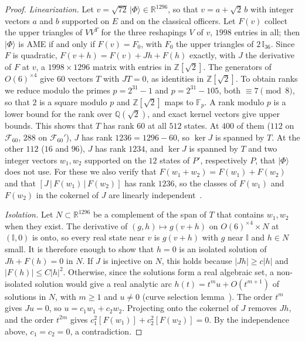 \documentclass[aps,pra,reprint,superscriptaddress,amsmath,amssymb,longbibliography]{revtex4-2}
\newcommand{\ket}[1]{\lvert #1\rangle}
\theoremstyle{plain}
\begin{document}
\begin{proof}
\emph{Linearization.}  Let $v=\sqrt{72}\,\ket\Phi\in\mathbb R^{1296}$, so that $v=a+\sqrt2\,b$ with integer vectors $a$
and $b$ supported on $E$ and on the classical officers.  Let $F(v)$ collect the upper triangles of $V V^T$ for the three
reshapings $V$ of $v$, $1998$ entries in all; then $\ket\Phi$ is AME if and only if $F(v)=F_0$, with $F_0$ the upper
triangles of $2\,\mathbb I_{36}$.  Since $F$ is quadratic, $F(v+h)=F(v)+Jh+F(h)$ exactly, with $J$ the derivative of
$F$ at $v$, a $1998\times1296$ matrix with entries in $\mathbb Z[\sqrt2]$.  The generators of $O(6)^{\times4}$ give $60$
vectors $T$ with $JT=0$, as identities in $\mathbb Z[\sqrt2]$.  To obtain ranks we reduce modulo the primes
$p=2^{31}-1$ and $p=2^{31}-105$, both $\equiv7\pmod 8$, so that $2$ is a square modulo $p$ and $\mathbb Z[\sqrt2]$ maps
to $\mathbb F_p$.  A rank modulo $p$ is a lower bound for the rank over $\mathbb Q(\sqrt2)$, and exact kernel vectors give
upper bounds.  This shows that $T$ has rank $60$ at all $512$ states.  At $400$ of them ($112$ on $\mathcal F_{60}$, $288$
on $\mathcal F_{60}'$), $J$ has rank $1236=1296-60$, so $\ker J$ is spanned by $T$.  At the other $112$ ($16$ and $96$),
$J$ has rank $1234$, and $\ker J$ is spanned by $T$ and two integer vectors $w_1,w_2$ supported on the $12$ states of
$P'$, respectively $P$, that $\ket\Phi$ does not use.  For these we also verify that $F(w_1+w_2)=F(w_1)+F(w_2)$ and that
$[J\,|\,F(w_1)\,|\,F(w_2)]$ has rank $1236$, so the classes of $F(w_1)$ and $F(w_2)$ in the cokernel of $J$ are
linearly independent~\cite{repo}.

\emph{Isolation.}  Let $N\subset\mathbb R^{1296}$ be a complement of the span of $T$ that contains $w_1,w_2$ when they
exist.  The derivative of $(g,h)\mapsto g(v+h)$ on $O(6)^{\times4}\times N$ at $(\mathbb I,0)$ is onto, so every real
state near $v$ is $g(v+h)$ with $g$ near $\mathbb I$ and $h\in N$ small.  It is therefore enough to show that $h=0$ is
an isolated solution of $Jh+F(h)=0$ in $N$.  If $J$ is injective on $N$, this holds because $|Jh|\ge c|h|$ and
$|F(h)|\le C|h|^2$.  Otherwise, since the solutions form a real algebraic set, a non-isolated solution would give a real
analytic arc $h(t)=t^mu+O(t^{m+1})$ of solutions in $N$, with $m\ge1$ and $u\ne0$ (curve selection lemma~\cite{Milnor1968}).  The order $t^m$
gives $Ju=0$, so $u=c_1w_1+c_2w_2$.  Projecting onto the cokernel of $J$ removes $Jh$, and the order $t^{2m}$ gives
$c_1^2[F(w_1)]+c_2^2[F(w_2)]=0$.  By the independence above, $c_1=c_2=0$, a contradiction.
\end{proof}
\end{document}
